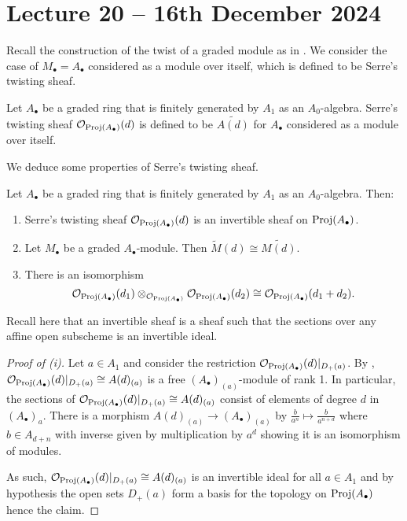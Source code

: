 \section{Lecture 20 -- 16th December 2024}\label{sec: lecture 20}
Recall the construction of the twist of a graded module as in . We consider the case of $M_{\bullet}=A_{\bullet}$ considered as a module over itself, which is defined to be Serre's twisting sheaf. 
\begin{definition}\label{def: serre twisting sheaf}
    Let $A_{\bullet}$ be a graded ring that is finitely generated by $A_{1}$ as an $A_{0}$-algebra. Serre's twisting sheaf $\mathcal{O}_{\operatorname{Proj}(A_{\bullet})}(d)$ is defined to be $\widetilde{A(d)}$ for $A_{\bullet}$ considered as a module over itself. 
\end{definition} 
We deduce some properties of Serre's twisting sheaf. 
\begin{proposition}\label{prop: serre twisting sheaf properties}
    Let $A_{\bullet}$ be a graded ring that is finitely generated by $A_{1}$ as an $A_{0}$-algebra. Then:
    \begin{enumerate}[label=(\roman*)]
        \item Serre's twisting sheaf $\mathcal{O}_{\operatorname{Proj}(A_{\bullet})}(d)$ is an invertible sheaf on $\operatorname{Proj}(A_{\bullet})$. 
        \item Let $M_{\bullet}$ be a graded $A_{\bullet}$-module. Then $\widetilde{M}(d)\cong\widetilde{M(d)}$. 
        \item There is an isomorphism $$\mathcal{O}_{\operatorname{Proj}(A_{\bullet})}(d_{1})\otimes_{\mathcal{O}_{\operatorname{Proj}(A_{\bullet})}}\mathcal{O}_{\operatorname{Proj}(A_{\bullet})}(d_{2})\cong\mathcal{O}_{\operatorname{Proj}(A_{\bullet})}(d_{1}+d_{2}).$$ 
    \end{enumerate}
\end{proposition}
Recall here that an invertible sheaf is a sheaf such that the sections over any affine open subscheme is an invertible ideal.  
\begin{proof}[Proof of (i)]
    Let $a\in A_{1}$ and consider the restriction $\mathcal{O}_{\operatorname{Proj}(A_{\bullet})}(d)|_{D_{+}(a)}$. By , $\mathcal{O}_{\operatorname{Proj}(A_{\bullet})}(d)|_{D_{+}(a)}\cong A(d)_{(a)}$ is a free $(A_{\bullet})_{(a)}$-module of rank 1. In particular, the sections of $\mathcal{O}_{\operatorname{Proj}(A_{\bullet})}(d)|_{D_{+}(a)}\cong A(d)_{(a)}$ consist of elements of degree $d$ in $(A_{\bullet})_{a}$. There is a morphism $A(d)_{(a)}\to (A_{\bullet})_{(a)}$ by $\frac{b}{a^{n}}\mapsto \frac{b}{a^{n+d}}$ where $b\in A_{d+n}$ with inverse given by multiplication by $a^{d}$ showing it is an isomorphism of modules. 

    As such, $\mathcal{O}_{\operatorname{Proj}(A_{\bullet})}(d)|_{D_{+}(a)}\cong A(d)_{(a)}$ is an invertible ideal for all $a\in A_{1}$ and by hypothesis the open sets $D_{+}(a)$ form a basis for the topology on $\operatorname{Proj}(A_{\bullet})$ hence the claim. 
\end{proof}
